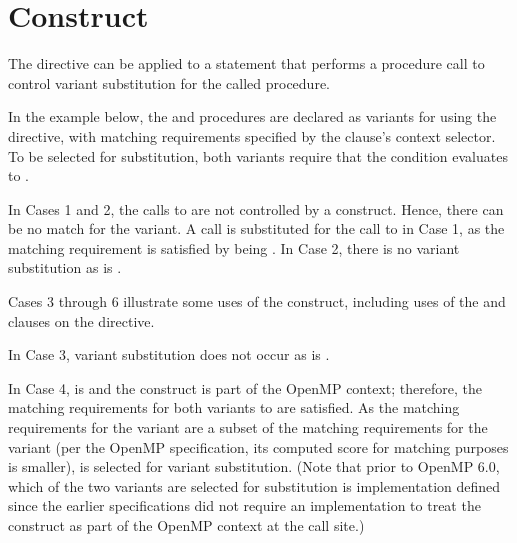 \pagebreak
\section{ Construct}
\label{sec:dispatch}




The  directive can be applied to a statement that performs a
procedure call to control variant substitution for the called procedure.

In the example below, the  and 
procedures are declared as variants for  using the
 directive, with matching requirements specified
by the  clause's context selector. To be selected for
substitution, both variants require that the condition  evaluates
to .

In Cases 1 and 2, the calls to  are not controlled by a
 construct. Hence, there can be no match for the
 variant. A  call is substituted for
the call to  in Case 1, as the matching requirement
is satisfied by  being . In Case 2, there is
no variant substitution as  is .

Cases 3 through 6 illustrate some uses of the  construct,
including uses of the  and  clauses on the
directive.

In Case 3, variant substitution does not occur as  is .

In Case 4,  is  and the  construct is
part of the OpenMP context; therefore, the matching requirements for both
variants to  are satisfied. As the matching requirements for the
 variant are a subset of the matching requirements for the
 variant (per the OpenMP specification, its computed score
for matching purposes is smaller),  is selected for
variant substitution. (Note that prior to OpenMP 6.0, which of the two variants
are selected for substitution is implementation defined since the earlier
specifications did not require an implementation to treat the 
construct as part of the OpenMP context at the call site.)

